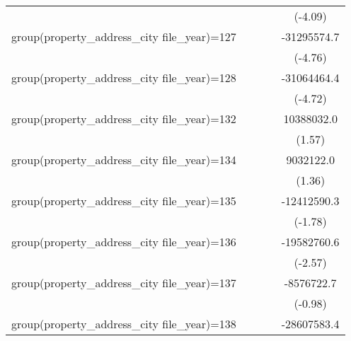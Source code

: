 {\begin{tabular}{l*{4}{c}}
                    &                     &                     &                     &     (-4.09)         \\
\addlinespace
group(property\_address\_city file\_year)=127&                     &                     &                     & -31295574.7\sym{***}\\
                    &                     &                     &                     &     (-4.76)         \\
\addlinespace
group(property\_address\_city file\_year)=128&                     &                     &                     & -31064464.4\sym{***}\\
                    &                     &                     &                     &     (-4.72)         \\
\addlinespace
group(property\_address\_city file\_year)=132&                     &                     &                     &  10388032.0         \\
                    &                     &                     &                     &      (1.57)         \\
\addlinespace
group(property\_address\_city file\_year)=134&                     &                     &                     &   9032122.0         \\
                    &                     &                     &                     &      (1.36)         \\
\addlinespace
group(property\_address\_city file\_year)=135&                     &                     &                     & -12412590.3         \\
                    &                     &                     &                     &     (-1.78)         \\
\addlinespace
group(property\_address\_city file\_year)=136&                     &                     &                     & -19582760.6\sym{*}  \\
                    &                     &                     &                     &     (-2.57)         \\
\addlinespace
group(property\_address\_city file\_year)=137&                     &                     &                     &  -8576722.7         \\
                    &                     &                     &                     &     (-0.98)         \\
\addlinespace
group(property\_address\_city file\_year)=138&                     &                     &                     & -28607583.4\sym{***}\\

\end{tabular}}
